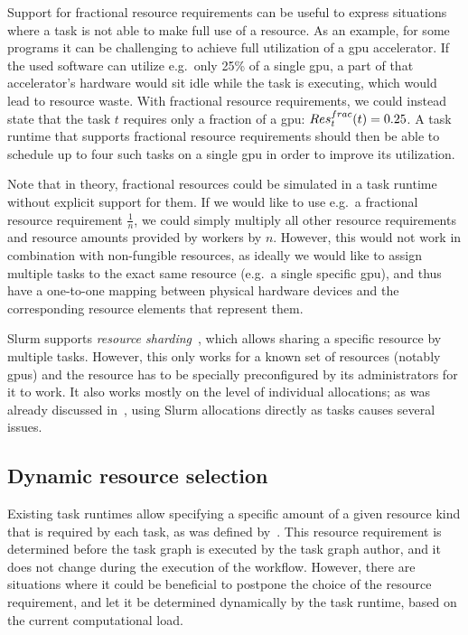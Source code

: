 Support for fractional resource requirements can be useful to express situations
where a task is not able to make full use of a resource. As an example, for some programs it can be
challenging to achieve full utilization of a \gls{gpu} accelerator. If the used software can
utilize e.g.\ only 25\% of a single \gls{gpu}, a part of that accelerator's hardware would sit idle
while the task is executing, which would lead to resource waste. With fractional resource
requirements, we could instead state that the task $t$ requires only a fraction of a \gls{gpu}: $Res_t^{frac}(t) = 0.25$. A task runtime that supports fractional resource requirements should then be able to schedule up to four such tasks on a single \gls{gpu} in order to improve its utilization.

Note that in theory, fractional resources could be simulated in a task runtime without explicit
support for them. If we would like to use e.g.\ a fractional resource requirement $\frac{1}{n}$, we could
simply multiply all other resource requirements and resource amounts provided by workers by $n$.
However, this would not work in combination with non-fungible resources, as ideally we would
like to assign multiple tasks to the exact same resource (e.g.\ a single specific \gls{gpu}),
and thus have a one-to-one mapping between physical hardware devices and the corresponding
resource elements that represent them.

Slurm supports \emph{resource sharding}~\cite{slurm-sharding}, which allows sharing a specific
resource by multiple tasks. However, this only works for a known set of resources (notably \glspl{gpu}) and
the resource has to be specially preconfigured by its administrators for it to work. It also
works mostly on the level of individual allocations; as was already discussed
in~, using Slurm allocations directly as tasks causes
several issues.

\subsection{Dynamic resource selection}
\label{sec:dynamic-resource-selection}
Existing task runtimes allow specifying a specific amount of a given resource kind that is
required by each task, as was defined by~. This resource requirement is
determined before the task graph is executed by the task graph author, and it does not change
during the execution of the workflow. However, there are situations where it could be beneficial to
postpone the choice of the resource requirement, and let it be determined dynamically by the
task runtime, based on the current computational load.

